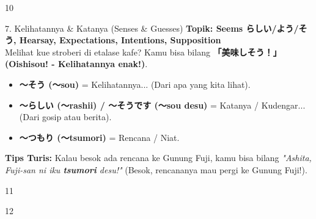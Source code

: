 \begin{convobox}{10}
    \noindent
      

    \vspace{1.5em}
\end{convobox}

\begin{lessonbox}{7. Kelihatannya \& Katanya (Senses \& Guesses)}
    \textbf{Topik: Seems らしい/よう/そう, Hearsay, Expectations, Intentions, Supposition} \\
    Melihat kue stroberi di etalase kafe? Kamu bisa bilang \textbf{「美味しそう！」 (Oishisou! - Kelihatannya enak!)}. 
    \begin{itemize}
        \item \textbf{〜そう (〜sou)} = Kelihatannya... (Dari apa yang kita lihat).
        \item \textbf{〜らしい (〜rashii) / 〜そうです (〜sou desu)} = Katanya / Kudengar... (Dari gosip atau berita).
        \item \textbf{〜つもり (〜tsumori)} = Rencana / Niat.
    \end{itemize}
    \textbf{Tips Turis:} Kalau besok ada rencana ke Gunung Fuji, kamu bisa bilang \textit{"Ashita, Fuji-san ni iku \textbf{tsumori} desu!"} (Besok, rencananya mau pergi ke Gunung Fuji!).
\end{lessonbox}

\begin{convobox}{11}
    \noindent
      

    \vspace{1.5em}
\end{convobox}

\begin{convobox}{12}
    \noindent
      
      

    \vspace{1.5em}
\end{convobox}

